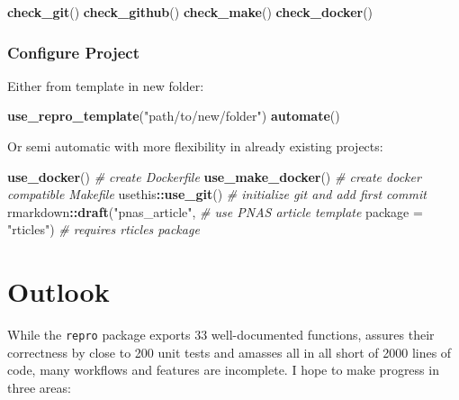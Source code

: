 \documentclass[12pt,a4paper,twoside]{article}
\newenvironment{Shaded}{\begin{snugshade}}{\end{snugshade}}
\newcommand{\CommentTok}[1]{\textcolor[rgb]{0.56,0.35,0.01}{\textit{#1}}}
\newcommand{\DataTypeTok}[1]{\textcolor[rgb]{0.13,0.29,0.53}{#1}}
\newcommand{\KeywordTok}[1]{\textcolor[rgb]{0.13,0.29,0.53}{\textbf{#1}}}
\newcommand{\NormalTok}[1]{#1}
\newcommand{\OperatorTok}[1]{\textcolor[rgb]{0.81,0.36,0.00}{\textbf{#1}}}
\newcommand{\StringTok}[1]{\textcolor[rgb]{0.31,0.60,0.02}{#1}}
\begin{document}
\begin{Shaded}
\begin{Highlighting}[]
\KeywordTok{check_git}\NormalTok{()}
\KeywordTok{check_github}\NormalTok{()}
\KeywordTok{check_make}\NormalTok{()}
\KeywordTok{check_docker}\NormalTok{()}
\end{Highlighting}
\end{Shaded}

\hypertarget{configure-project}{%
\subsubsection{Configure Project}\label{configure-project}}

Either from template in new folder:

\begin{Shaded}
\begin{Highlighting}[]
\KeywordTok{use_repro_template}\NormalTok{(}\StringTok{"path/to/new/folder"}\NormalTok{)}
\KeywordTok{automate}\NormalTok{()}
\end{Highlighting}
\end{Shaded}

Or semi automatic with more flexibility in already existing projects:

\begin{Shaded}
\begin{Highlighting}[]
\KeywordTok{use_docker}\NormalTok{() }\CommentTok{# create Dockerfile}
\KeywordTok{use_make_docker}\NormalTok{() }\CommentTok{# create docker compatible Makefile}
\NormalTok{usethis}\OperatorTok{::}\KeywordTok{use_git}\NormalTok{() }\CommentTok{# initialize git and add first commit}
\NormalTok{rmarkdown}\OperatorTok{::}\KeywordTok{draft}\NormalTok{(}\StringTok{"pnas_article"}\NormalTok{, }\CommentTok{# use PNAS article template}
                 \DataTypeTok{package =} \StringTok{"rticles"}\NormalTok{) }\CommentTok{# requires rticles package}
\end{Highlighting}
\end{Shaded}

\hypertarget{outlook}{%
\section{Outlook}\label{outlook}}

While the \texttt{repro} package exports 33 well-documented functions, assures their correctness by close to 200 unit tests and amasses all in all short of 2000 lines of code, many workflows and features are incomplete.
I hope to make progress in three areas:
\end{document}
